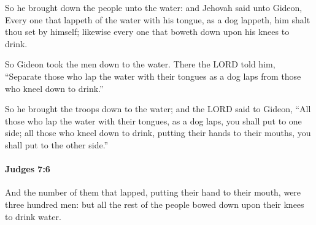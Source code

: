 			\begin{versebox}
					\item[BHS] 
					\item[ASV] So he brought down the people unto the water: and Jehovah said unto Gideon, Every one that lappeth of the water with his tongue, as a dog lappeth, him shalt thou set by himself; likewise every one that boweth down upon his knees to drink.
					\item[NIV] So Gideon took the men down to the water. There the LORD told him, “Separate those who lap the water with their tongues as a dog laps from those who kneel down to drink.”
					\item[NRSV] So he brought the troops down to the water; and the LORD said to Gideon, “All those who lap the water with their tongues, as a dog laps, you shall put to one side; all those who kneel down to drink, putting their hands to their mouths, you shall put to the other side.”
			\end{versebox}

		\paragraph{Judges 7:6} %
			\label{JUDGES-7-6}

			And the number of them that lapped, putting their hand to their mouth, were three hundred men: but all the rest of the people bowed down upon their knees to drink water.

